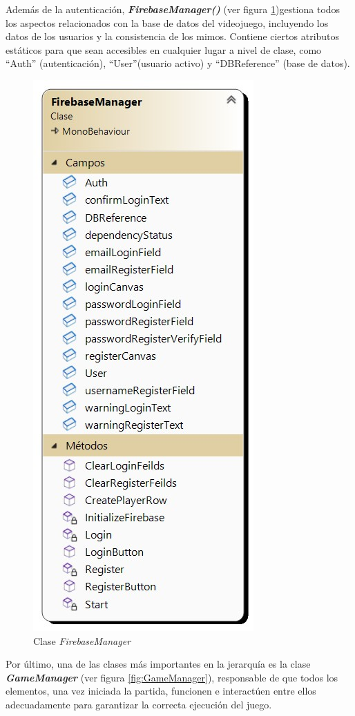 Además de la autenticación, \textbf{\textit{FirebaseManager()}} (ver figura \ref{fig:FirebaseManager})gestiona todos los aspectos relacionados con la base de datos del videojuego, incluyendo los datos de los usuarios y la consistencia de los mimos. Contiene ciertos atributos estáticos para que sean accesibles en cualquier lugar a nivel de clase, como ``Auth'' (autenticación), ``User''(usuario activo) y ``DBReference'' (base de datos).
\begin{figure}[h]
	\centering
	\includegraphics[scale=0.45]{img/FirebaseManager.jpg}
	\caption{Clase \textit{FirebaseManager}}
	\label{fig:FirebaseManager}
    \end{figure}
Por último, una de las clases más importantes en la jerarquía es la clase \textbf{\textit{GameManager}} (ver figura \ref{fig:GameManager}), responsable de que todos los elementos, una vez iniciada la partida, funcionen e interactúen entre ellos adecuadamente para garantizar la correcta ejecución del juego.

